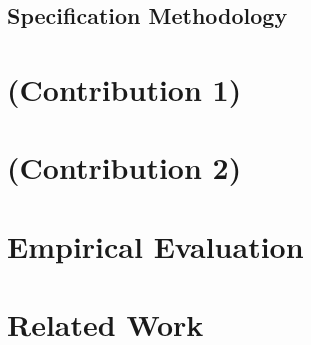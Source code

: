 \documentclass[acmsmall,review,authorversion]{acmart}
\begin{document}
\subsection{Specification Methodology }


\section{(Contribution 1)}

\section{(Contribution 2)}

\section{Empirical Evaluation}

\section{Related Work}
\end{document}
